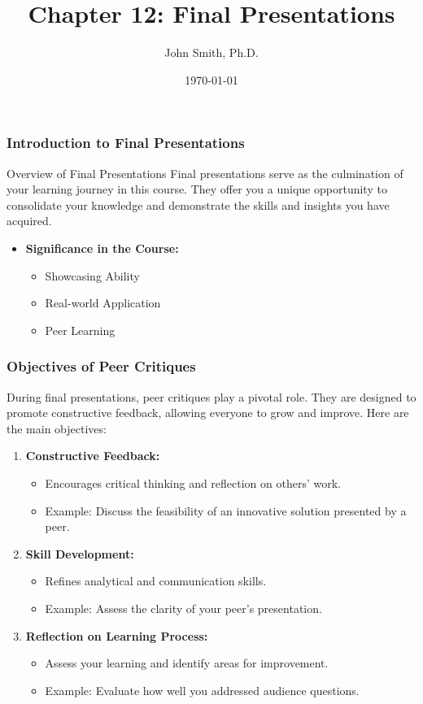 \documentclass[aspectratio=169]{beamer}
\title[Chapter 12: Final Presentations]{Chapter 12: Final Presentations}
\author[J. Smith]{John Smith, Ph.D.}
\institute[University Name]{
  Department of Computer Science\\
  University Name\\
  \vspace{0.3cm}
  Email: email@university.edu\\
  Website: www.university.edu
}
\date{\today}
\begin{document}
\frame{\titlepage}

\begin{frame}[fragile]
    \frametitle{Introduction to Final Presentations}
    \begin{block}{Overview of Final Presentations}
        Final presentations serve as the culmination of your learning journey in this course. They offer you a unique opportunity to consolidate your knowledge and demonstrate the skills and insights you have acquired.
    \end{block}
    
    \begin{itemize}
        \item \textbf{Significance in the Course:}
        \begin{itemize}
            \item Showcasing Ability
            \item Real-world Application
            \item Peer Learning
        \end{itemize}
    \end{itemize}
\end{frame}

\begin{frame}[fragile]
    \frametitle{Objectives of Peer Critiques}
    During final presentations, peer critiques play a pivotal role. They are designed to promote constructive feedback, allowing everyone to grow and improve. Here are the main objectives:
    
    \begin{enumerate}
        \item \textbf{Constructive Feedback:}
            \begin{itemize}
                \item Encourages critical thinking and reflection on others' work.
                \item Example: Discuss the feasibility of an innovative solution presented by a peer.
            \end{itemize}
        
        \item \textbf{Skill Development:}
            \begin{itemize}
                \item Refines analytical and communication skills.
                \item Example: Assess the clarity of your peer's presentation.
            \end{itemize}

        \item \textbf{Reflection on Learning Process:}
            \begin{itemize}
                \item Assess your learning and identify areas for improvement.
                \item Example: Evaluate how well you addressed audience questions.
            \end{itemize}
    \end{enumerate}
\end{frame}
\end{document}
